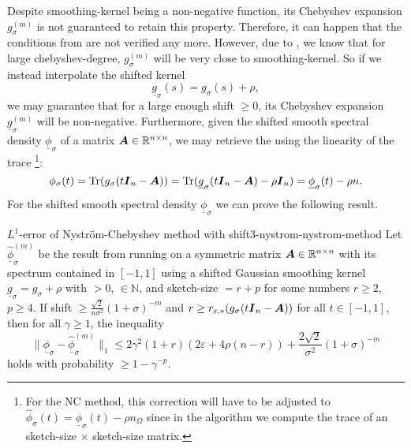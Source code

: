 Despite \gls{smoothing-kernel} being a non-negative function, its Chebyshev
expansion $g_{\sigma}^{(m)}$ is not guaranteed to retain this property.
Therefore, it can happen that the conditions from 
are not verified any more.
However, due to , we know that for large
\gls{chebyshev-degree}, $g_{\sigma}^{(m)}$ will be very close to \gls{smoothing-kernel}.
So if we instead interpolate the shifted kernel
\begin{equation}
    \underline{g}_{\sigma}(s) = g_{\sigma}(s) + \rho,
    \label{equ:3-nystrom-up-shifted-kernel}
\end{equation}
we may guarantee that for a large enough \gls{shift} $\geq 0$, its Chebyshev expansion
$\underline{g}_{\sigma}^{(m)}$ will be non-negative. Furthermore, given
the shifted smooth spectral density $\underline{\phi}_{\sigma}$ of a matrix $\boldsymbol{A} \in \mathbb{R}^{n \times n}$,
we may retrieve the  using the linearity of the trace
\footnote{For the \gls{NC} method, this correction will have to be adjusted to
$\widehat{\phi}_{\sigma}(t) = \underline{\phi}_{\sigma}(t) - \rho n_{\Omega}$
since in the algorithm we compute the trace of an \gls{sketch-size} $\times$ \gls{sketch-size}
matrix.}:
\begin{equation}
    \phi_{\sigma}(t)
    = \operatorname{Tr}(g_{\sigma}(t\boldsymbol{I}_n - \boldsymbol{A}))
    = \operatorname{Tr}(\underline{g}_{\sigma}(t\boldsymbol{I}_n - \boldsymbol{A}) - \rho \boldsymbol{I}_n)
    = \underline{\phi}_{\sigma}(t) - \rho n.
    \label{equ:3-nystrom-revert-shift}
\end{equation}
For the shifted smooth spectral density $\underline{\phi}_{\sigma}$ we can prove the following result.
\begin{theorem}{$L^1$-error of Nystr\"om-Chebyshev method with shift}{3-nystrom-nystrom-method}
    Let $\widehat{\underline{\phi}}_{\sigma}^{(m)}$ be the result from running
     on a symmetric matrix
    $\boldsymbol{A} \in \mathbb{R}^{n \times n}$ with its spectrum contained in $[-1, 1]$
    using a shifted Gaussian smoothing kernel $\underline{g}_{\sigma} = g_{\sigma} + \rho$
    with  $>0$,  $\in \mathbb{N}$, and
    \gls{sketch-size} $=r + p$ for some numbers $r \geq 2$, $p \geq 4$.
    If \gls{shift} $\geq \frac{\sqrt{2}}{n \sigma^2}  (1 + \sigma)^{-m}$
    and $r \geq r_{\varepsilon, \ast}(g_{\sigma}(t\boldsymbol{I}_n - \boldsymbol{A}))$ for all
    $t \in [-1, 1]$, then for all $\gamma \geq 1$, the inequality
    \begin{equation}
        \lVert \underline{\phi}_{\sigma} - \widehat{\underline{\phi}}_{\sigma}^{(m)} \rVert _1
        \leq 2 \gamma^2(1 + r) (2 \varepsilon + 4 \rho (n-r))
        + \frac{2\sqrt{2}}{\sigma^2} (1 + \sigma)^{-m}
    \end{equation}
    holds with probability $\geq 1-\gamma^{-p}$.
\end{theorem}

